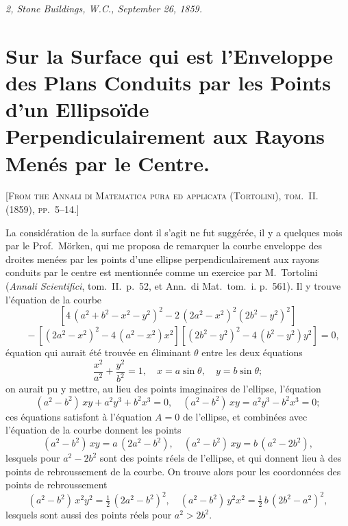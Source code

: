 \documentclass[11pt,a4paper]{article}
\begin{document}
\smallskip
\noindent\textit{2, Stone Buildings, W.C., September 26, 1859.}

\newpage


\setcounter{page}{123}

\section*{Sur la Surface qui est l'Enveloppe des Plans Conduits par les Points d'un Ellipsoïde Perpendiculairement aux Rayons Menés par le Centre.}
\label{paper:250}

\textsc{[From the Annali di Matematica pura ed applicata (Tortolini), tom.~II. (1859), pp.~5--14.]}

\medskip

La considération de la surface dont il s'agit ne fut suggérée, il y a quelques mois par le Prof.~Mörken, qui me proposa de remarquer la courbe enveloppe des droites menées par les points d'une ellipse perpendiculairement aux rayons conduits par le centre est mentionnée comme un exercice par M.~Tortolini (\textit{Annali Scientifici}, tom.~II.~p.~52, et Ann.~di Mat.~tom.~i. p.~561). Il y trouve l'équation de la courbe
\[
[4\,(a^2+b^2-x^2-y^2)^2 - 2\,(2a^2-x^2)^2(2b^2-y^2)^2]
\]
\[
\quad - [(2a^2-x^2)^2 - 4\,(a^2-x^2)x^2][(2b^2-y^2)^2 - 4\,(b^2-y^2)y^2] = 0,
\]
équation qui aurait été trouvée en éliminant $\theta$ entre les deux équations
\[
\frac{x^2}{a^2} + \frac{y^2}{b^2} = 1,\quad x = a\sin\theta,\quad y = b\sin\theta;
\]
on aurait pu y mettre, au lieu des points imaginaires de l'ellipse, l'équation
\[
(a^2-b^2)\,xy + a^2y^3 + b^2x^3 = 0,\quad (a^2-b^2)\,xy = a^2y^3 - b^2x^3 = 0;
\]
ces équations satisfont à l'équation $A=0$ de l'ellipse, et combinées avec l'équation de la courbe donnent les points
\[
(a^2-b^2)\,xy = a\,(2a^2-b^2),\quad (a^2-b^2)\,xy = b\,(a^2-2b^2),
\]
lesquels pour $a^2-2b^2$ sont des points réels de l'ellipse, et qui donnent lieu à des points de rebroussement de la courbe. On trouve alors pour les coordonnées des points de rebroussement
\[
(a^2-b^2)\,x^2y^2 = \tfrac{1}{2}\,(2a^2-b^2)^2,\quad (a^2-b^2)\,y^2x^2 = \tfrac{1}{2}\,b\,(2b^2-a^2)^2,
\]
lesquels sont aussi des points réels pour $a^2 > 2b^2$.
\end{document}
